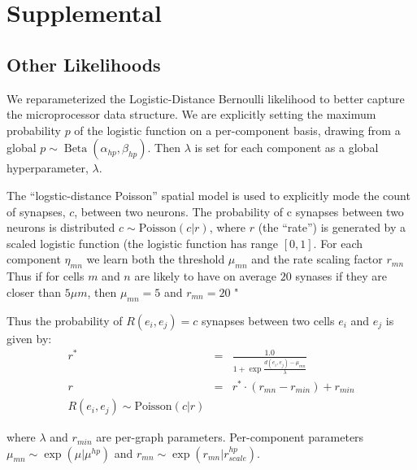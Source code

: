 \documentclass{article}
\begin{document}
\newpage
\section{Supplemental}

\subsection{Other Likelihoods}
\label{supp:otherlikelihoods}

We reparameterized the Logistic-Distance Bernoulli likelihood to
better capture the microprocessor data structure. We are explicitly
setting the maximum probability $p$ of the logistic function on a
per-component basis, drawing from a global $p \sim \operatorname{Beta}(\alpha_{hp},
\beta_{hp})$. Then $\lambda$ is set for each component as a global
hyperparameter, $\lambda$.

The ``logstic-distance Poisson'' spatial model is used to explicitly mode the count of synapses, $c$, between two neurons. The probability of c synapses between two neurons is distributed $c \sim \textrm{Poisson}(c | r)$, where $r$ (the ``rate'') is generated by a scaled logistic function (the logistic function has range $[0, 1]$. For each component $\eta_{mn}$ we learn both the threshold $\mu_{mn}$ and the rate scaling factor $r_{mn}$ Thus if for cells $m$ and $n$ are likely to have on average $20$ synases if they are closer than $5 \mu m$, then $\mu_{mn} = 5$ and $r_{mn} = 20$  " 

Thus the probability of $R(e_i, e_j) = c$ synapses between two cells $e_i$ and $e_j$ is given by:
\begin{eqnarray}
r^* &=& \frac{1.0}{1 + \exp \frac{d(e_i, e_j) - \mu_{mn}}{\lambda}}\\
r & = & r^* \cdot (r_{mn} - r_{min}) + r_{min} \\
R(e_i, e_j) \sim \textrm{Poisson}(c | r)
\end{eqnarray}

where $\lambda$ and $r_{min}$ are per-graph parameters. Per-component parameters $\mu_{mn} \sim \exp(\mu | \mu^{hp})$ and $r_{mn} \sim \exp(r_{mn} | r_{scale}^{hp})$. 
\end{document}
